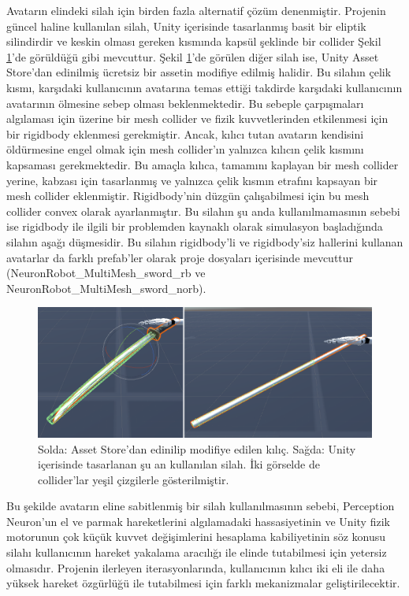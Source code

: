 \documentclass[a4paper, 12pt, titlepage]{article}
\begin{document}
Avatarın elindeki silah için birden fazla alternatif çözüm denenmiştir. Projenin güncel haline
kullanılan silah, Unity içerisinde tasarlanmış basit bir eliptik silindirdir ve keskin olması
gereken kısmında kapsül şeklinde bir collider Şekil \ref{s}’de görüldüğü gibi mevcuttur. Şekil
\ref{s}’de görülen diğer silah ise, Unity Asset Store’dan edinilmiş ücretsiz bir assetin modifiye
edilmiş halidir. Bu silahın çelik kısmı, karşıdaki kullanıcının avatarına temas ettiği takdirde
karşıdaki kullanıcının avatarının ölmesine sebep olması beklenmektedir. Bu sebeple çarpışmaları
algılaması için üzerine bir mesh collider ve fizik kuvvetlerinden etkilenmesi için bir rigidbody
eklenmesi gerekmiştir. Ancak, kılıcı tutan avatarın kendisini öldürmesine engel olmak için mesh
collider’ın yalnızca kılıcın çelik kısmını kapsaması gerekmektedir. Bu amaçla kılıca, tamamını
kaplayan bir mesh collider yerine, kabzası için tasarlanmış ve yalnızca çelik kısmın etrafını
kapsayan bir mesh collider eklenmiştir. Rigidbody’nin düzgün çalışabilmesi için bu mesh collider
convex olarak ayarlanmıştır. Bu silahın şu anda kullanılmamasının sebebi ise rigidbody ile ilgili
bir problemden kaynaklı olarak simulasyon başladığında silahın aşağı düşmesidir. Bu silahın
rigidbody’li ve rigidbody’siz hallerini kullanan avatarlar da farklı prefab’ler olarak proje
dosyaları içerisinde mevcuttur (NeuronRobot\_MultiMesh\_sword\_rb ve
NeuronRobot\_MultiMesh\_sword\_norb).

\begin{figure}[hbt!]
    \centering
        \includegraphics[width=6in]{images/s}
    \caption{Solda: Asset Store'dan edinilip modifiye edilen kılıç. Sağda: Unity içerisinde
             tasarlanan şu an kullanılan silah. İki görselde de collider'lar yeşil çizgilerle
             gösterilmiştir.}
    \label{s}
\end{figure}

Bu şekilde avatarın eline sabitlenmiş bir silah kullanılmasının sebebi, Perception Neuron’un el ve
parmak hareketlerini algılamadaki hassasiyetinin ve Unity fizik motorunun çok küçük kuvvet
değişimlerini hesaplama kabiliyetinin söz konusu silahı kullanıcının hareket yakalama aracılığı ile
elinde tutabilmesi için yetersiz olmasıdır. Projenin ilerleyen iterasyonlarında, kullanıcının
kılıcı iki eli ile daha yüksek hareket özgürlüğü ile tutabilmesi için farklı mekanizmalar
geliştirilecektir.
\end{document}
